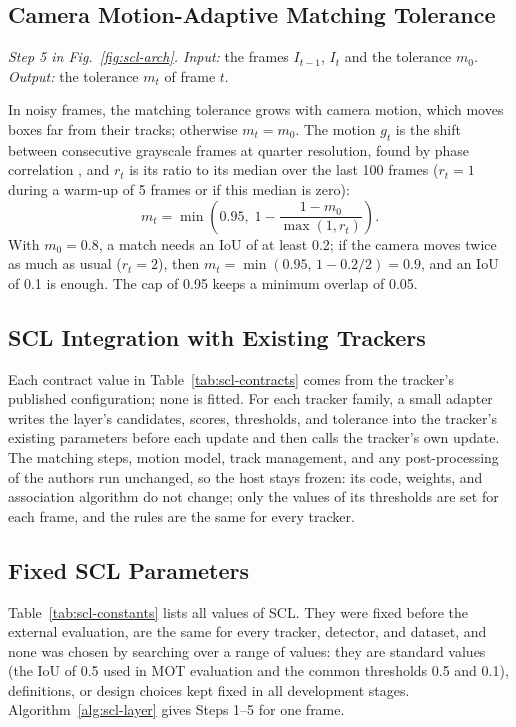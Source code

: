 \subsection{Camera Motion-Adaptive Matching Tolerance}\label{sec:scl-motion}
\emph{Step 5 in Fig.~\ref{fig:scl-arch}. Input:} the frames $I_{t-1}$, $I_t$ and the tolerance $m_0$. \emph{Output:} the tolerance $m_t$ of frame $t$.

In noisy frames, the matching tolerance grows with camera motion, which moves boxes far from their tracks; otherwise $m_t=m_0$. The motion $g_t$ is the shift between consecutive grayscale frames at quarter resolution, found by phase correlation \cite{tong2019fourier}, and $r_t$ is its ratio to its median over the last 100 frames ($r_t=1$ during a warm-up of 5 frames or if this median is zero):
\begin{equation}
m_t=\min\!\left(0.95,\;1-\frac{1-m_0}{\max(1,r_t)}\right).
\label{eq:scl-motion}
\end{equation}
With $m_0=0.8$, a match needs an IoU of at least 0.2; if the camera moves twice as much as usual ($r_t=2$), then $m_t=\min(0.95,\,1-0.2/2)=0.9$, and an IoU of 0.1 is enough. The cap of 0.95 keeps a minimum overlap of 0.05.

\subsection{SCL Integration with Existing Trackers}\label{sec:scl-contract}
Each contract value in Table~\ref{tab:scl-contracts} comes from the tracker's published configuration; none is fitted. For each tracker family, a small adapter writes the layer's candidates, scores, thresholds, and tolerance into the tracker's existing parameters before each update and then calls the tracker's own update. The matching steps, motion model, track management, and any post-processing of the authors run unchanged, so the host stays frozen: its code, weights, and association algorithm do not change; only the values of its thresholds are set for each frame, and the rules are the same for every tracker.

\subsection{Fixed SCL Parameters}\label{sec:scl-constants}
Table~\ref{tab:scl-constants} lists all values of SCL. They were fixed before the external evaluation, are the same for every tracker, detector, and dataset, and none was chosen by searching over a range of values: they are standard values (the IoU of 0.5 used in MOT evaluation and the common thresholds 0.5 and 0.1), definitions, or design choices kept fixed in all development stages. Algorithm~\ref{alg:scl-layer} gives Steps 1--5 for one frame.

